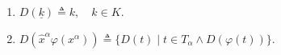 \begin{enumerate}
\item $D(\underline{k}) \triangleq k, \quad k \in K.$
\item $D(\hat{x}^\alpha \varphi(x^\alpha)) \triangleq \{D(t) \mid t \in T_\alpha \land D(\varphi(t))\}.$
\end{enumerate}
